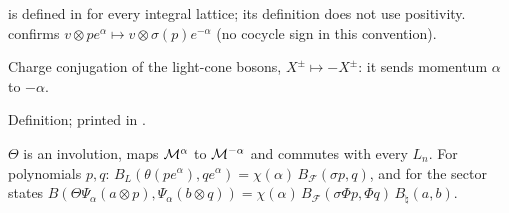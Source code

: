 \begin{dictionary}
 is defined in  for every integral lattice; its definition does not
use positivity.   confirms $v\otimes pe^\alpha\mapsto v\otimes\sigma(p)e^{-\alpha}$ (no cocycle sign
in this convention).
\end{dictionary}

\begin{physics}
Charge conjugation of the light-cone bosons, $X^\pm\mapsto-X^\pm$: it sends momentum $\alpha$ to $-\alpha$.
\end{physics}

\begin{status}
Definition; printed in .
\end{status}

\begin{theorem}\label{ch17:thm:momentumform}
$\Theta$ is an involution, maps $\mathcal{M}^\alpha$ to $\mathcal{M}^{-\alpha}$ and commutes with every $L_n$.  For polynomials
$p,q$: $B_L(\theta(pe^\alpha),qe^\alpha)=\chi(\alpha)\,B_{\mathcal F}(\sigma p,q)$, and for the sector states
$B(\Theta\Psi_\alpha(a\otimes p),\Psi_\alpha(b\otimes q))=\chi(\alpha)\,B_{\mathcal F}(\sigma\Phi p,\Phi q)\,B_\natural(a,b)$.
\end{theorem}

